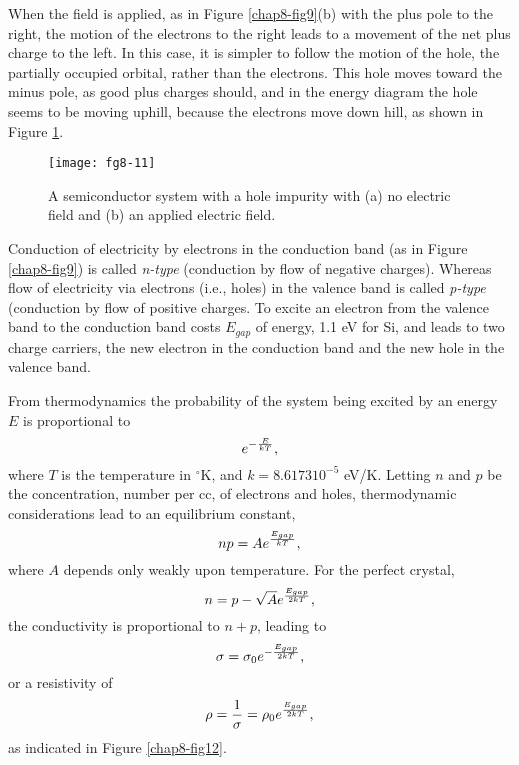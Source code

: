 When the field is applied, as in Figure \ref{chap8-fig9}(b) with the
plus pole to the right, the motion of the electrons to the right leads
to a movement of the net plus charge to the left.  In this case, it is
simpler to follow the motion of the hole, the partially occupied
orbital, rather than the electrons.  This hole moves toward the minus
pole, as good plus charges should, and in the energy diagram the hole
seems to be moving uphill, because the electrons move down hill, as
shown in Figure \ref{chap8-fig11}.

\begin{figure}
\begin{center}
\texttt{[image: fg8-11]}
\end{center}
\caption{A semiconductor system with a hole impurity with (a) no
electric field and (b) an applied electric field.}
\label{chap8-fig11}
\end{figure}


Conduction of electricity by electrons in the conduction band (as in
Figure \ref{chap8-fig9}) is called \emph{n-type} (conduction by flow
of negative charges).  Whereas flow of electricity via electrons
(i.e., holes) in the valence band is called \emph{p-type} (conduction
by flow of positive charges. To excite an electron from the valence
band to the conduction band costs $E_{gap}$ of energy, 1.1 eV for Si,
and leads to two charge carriers, the new electron in the conduction
band and the new hole in the valence band.

From thermodynamics the probability of the system being excited by an 
energy $E$ is proportional to
\begin{equation}
e^{-{E \over kT}} ,
\end{equation}
where $T$ is the temperature in $^{\circ}$K, and $k = 8.6173 10^{-5}$ 
eV/K.  Letting $n$ and $p$ be the concentration, number per cc, of electrons 
and holes, thermodynamic considerations lead to an equilibrium constant,
\begin{equation}
np = Ae^{{E_{gap} \over kT}} ,
\end{equation}
where $A$ depends only weakly upon temperature.  For the perfect crystal,
\begin{equation}
n = p - \sqrt{A} e^{{E_{gap} \over 2kT}} ,
\end{equation}
the conductivity is proportional to $n + p$, leading to
\begin{equation}
\sigma = \sigma_0 e^{-{E_{gap} \over 2kT}} ,
\end{equation}
or a resistivity of
\begin{equation}
\rho = {1 \over \sigma} = \rho_0 e^{{E_{gap} \over 2kT}} ,
\end{equation}
as indicated in Figure \ref{chap8-fig12}.


